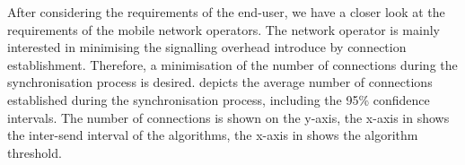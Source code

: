 After considering the requirements of the end-user, we have a closer look at the requirements of the mobile network operators.
The network operator is mainly interested in minimising the signalling overhead introduce by connection establishment.
Therefore, a minimisation of the number of connections \connectionCount during the synchronisation process is desired.
 depicts the average number of connections \connectionCount established during the synchronisation process, including the 95\% confidence intervals.
The number of connections is shown on the y-axis, the x-axis in  shows the inter-send interval of the \algointerval algorithms, the x-axis in  shows the \algosize algorithm threshold.

